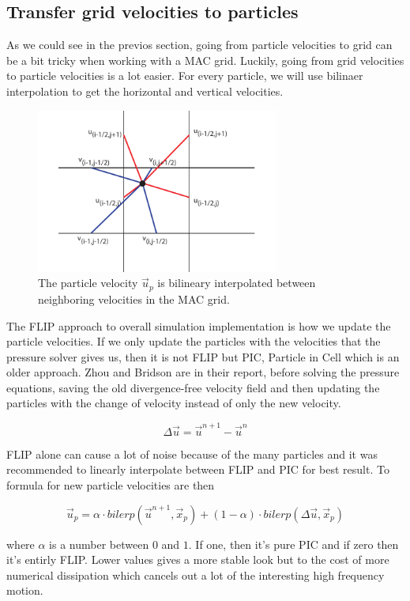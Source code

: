 \subsection{Transfer grid velocities to particles}

As we could see in the previos section, going from particle velocities to grid can be a bit tricky when working with a MAC grid. Luckily, going from grid velocities to particle velocities is a lot easier. For every particle, we will use bilinaer interpolation to get the horizontal and vertical velocities.

\begin{figure}[ht!]
\centering
\includegraphics[width=80mm]{img/splat.pdf}
\caption{The particle velocity $\vec{u}_p$ is bilineary interpolated between neighboring velocities in the MAC grid.}
\label{onedge}
\end{figure}

The FLIP approach to overall simulation implementation is how we update the particle velocities. If we only update the particles with the velocities that the pressure solver gives us, then it is not FLIP but PIC, Particle in Cell which is an older approach. Zhou and Bridson are in their report, before solving the pressure equations, saving the old divergence-free velocity field and then updating the particles with the change of velocity instead of only the new velocity.

\begin{equation}
\Delta \vec{u} = \vec{u}^{n+1} - \vec{u}^n
\end{equation}

FLIP alone can cause a lot of noise because of the many particles and it was recommended to linearly interpolate between FLIP and PIC for best result. To formula for new particle velocities are then

\begin{equation}
\vec{u}_p = \alpha \cdot bilerp(\vec{u}^{n+1}, \vec{x}_p) + (1-\alpha) \cdot bilerp(\Delta \vec{u},\vec{x}_p)
\label{flipeq}
\end{equation}

where $\alpha$ is a number between $0$ and $1$. If one, then it's pure PIC and if zero then it's entirly FLIP. Lower values gives a more stable look but to the cost of more numerical dissipation which cancels out a lot of the interesting high frequency motion.

